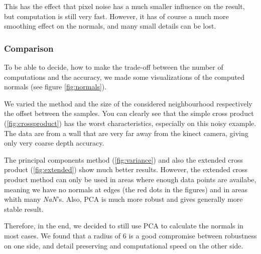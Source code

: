 \documentclass[10pt,twocolumn,letterpaper]{article}
\begin{document}
This has the effect that pixel noise has a much smaller influence on the result, but computation is still very fast. However, it has of course a much more
smoothing effect on the normals, and many small details can be lost.

\subsubsection{Comparison}
To be able to decide, how to make the trade-off between the number of computations and the accuracy, we made some visualizations of the computed
normals (see figure \ref{fig:normals}).

We varied the method and the size of the considered neighbourhood respectively the offset between the samples. You can clearly see that the simple cross
product (\ref{fig:crossproduct}) has the worst characteristics, especially on this noisy example. The data are from a wall that are very far away from
the kinect camera, giving only very coarse depth accuracy.

The principal components method (\ref{fig:variance}) and also the extended cross product (\ref{fig:extended}) show much better results. However, the
extended cross product method can only be used in areas where enough data points are availabe, meaning we have no normals at edges (the red dots in 
the figures) and in areas whith many \textit{NaN}'s. Also, PCA is much more robust and gives generally more stable result.

Therefore, in the end, we decided to still use PCA to calculate the normals in most cases. We found that a radius of 6 is a good compromise between
robustness on one side, and detail preserving and computational speed on the other side.
\end{document}
